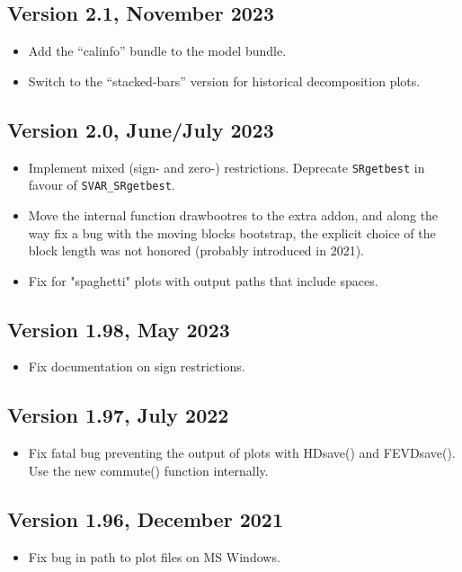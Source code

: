 \documentclass[a4paper,10pt]{article}
\newcommand{\cmd}[1]{\texttt{#1}}
\begin{document}
\subsection*{Version 2.1, November 2023}
\begin{itemize}
\item Add the ``calinfo'' bundle to the model bundle. 
\item Switch to the ``stacked-bars'' version for historical
  decomposition plots. 
\end{itemize}

\subsection*{Version 2.0, June/July 2023}
\begin{itemize}
\item Implement mixed (sign- and zero-) restrictions. Deprecate \cmd{SRgetbest}
 in favour of \cmd{SVAR\_SRgetbest}. 
\item Move the internal function drawbootres to the extra addon, and along the
 way fix a bug with the moving blocks bootstrap, the explicit choice of the
 block length was not honored (probably introduced in 2021).  
\item Fix for "spaghetti" plots with output paths that include spaces.   
\end{itemize}

\subsection*{Version 1.98, May 2023}
\begin{itemize}
\item Fix documentation on sign restrictions.
\end{itemize}

\subsection*{Version 1.97, July 2022}
\begin{itemize}
\item Fix fatal bug preventing the output of plots with HDsave() and
  FEVDsave(). Use the new commute() function internally.
\end{itemize}

\subsection*{Version 1.96, December 2021}
\begin{itemize}
\item Fix bug in path to plot files on MS Windows.
\end{itemize}
\end{document}

